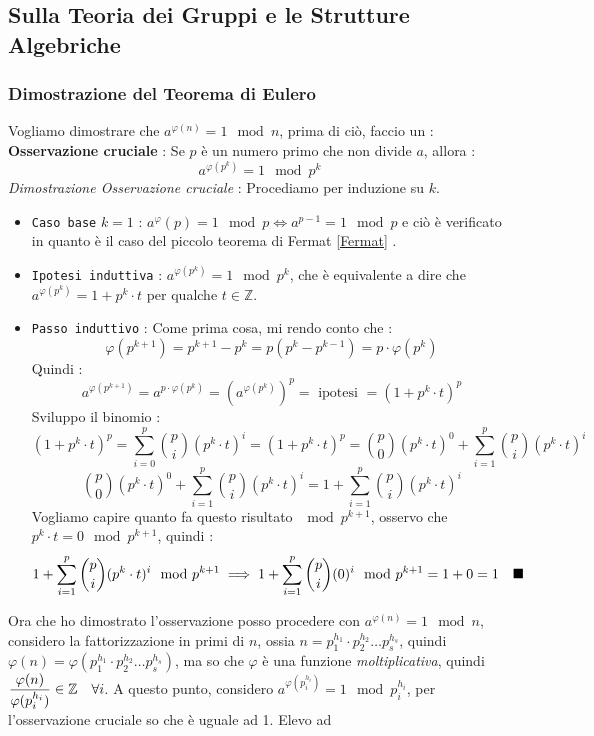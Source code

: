 \documentclass[12pt, letterpaper]{article}
\newcommand{\code}[1]{\colorbox{light-gray}{\texttt{#1}}}
\newcommand{\Z}{{\mathbb Z}}
\newcommand{\spaz}{{\text{\hphantom{aa}}}}
\begin{document}
\subsection{Sulla Teoria dei Gruppi e le Strutture Algebriche}
\subsubsection{Dimostrazione del Teorema di Eulero} \label{dimTeoEulero} 
Vogliamo dimostrare che \(a^{\varphi(n)}=1 \mod n\), prima di ciò, faccio un :\\
\textbf{Osservazione cruciale} : Se \(p\) è un numero primo che non divide \(a\), allora : 
$$a^{\varphi(p^k)}=1 \mod p^k$$
\textit{Dimostrazione Osservazione cruciale} : Procediamo per induzione su \(k\).\begin{itemize}
    \item  \code{Caso base} \(k=1\) : \(a^\varphi(p)=1 \mod p\iff a^{p-1}=1\mod p\) e ciò è verificato in quanto è il caso del piccolo 
    teorema di Fermat \ref{Fermat} .
    \item \code{Ipotesi induttiva} : \(a^{\varphi(p^k)}=1 \mod p^k\), che è equivalente a dire che  \(a^{\varphi(p^k)}=1+p^k\cdot t\) per qualche \(t\in\Z\).
    \item\code{Passo induttivo} : Come prima cosa, mi rendo conto che : 
    $$\varphi(p^{k+1})=p^{k+1}-p^k=p(p^k-p^{k-1})=p\cdot\varphi(p^k)$$
    Quindi : 
    $$a^{\varphi(p^{k+1})}=a^{p\cdot\varphi(p^k)}=(a^{\varphi(p^k)})^p=\text{ ipotesi }=(1+p^k\cdot t)^p$$
    Sviluppo il binomio : 
    $$(1+p^k\cdot t)^p=\sum_{i=0}^p\binom{p}{i}(p^k\cdot t)^i=(1+p^k\cdot t)^p=\binom{p}{0}(p^k\cdot t)^0+\sum_{i=1}^p\binom{p}{i}(p^k\cdot t)^i$$
    $$\binom{p}{0}(p^k\cdot t)^0+\sum_{i=1}^p\binom{p}{i}(p^k\cdot t)^i=1+\sum_{i=1}^p\binom{p}{i}(p^k\cdot t)^i$$
    Vogliamo capire quanto fa questo risultato \(\mod p^{k+1}\), osservo che \(p^k\cdot t =0 \mod p^{k+1}\), quindi : 
    $$1+\sum_{i=1}^p\binom{p}{i}(p^k\cdot t)^i\mod p^{k+1}\implies 1+\sum_{i=1}^p\binom{p}{i}(0)^i\mod p^{k+1}=1+0=1 \spaz \blacksquare$$
\end{itemize}
 Ora che ho dimostrato l'osservazione posso procedere con \(a^{\varphi(n)}=1 \mod n\), considero la fattorizzazione in primi 
 di \(n\), ossia \(n=p_1^{h_1}\cdot p_2^{h_2}\dots p_s^{h_s}\), quindi \(\varphi(n)=\varphi(p_1^{h_1}\cdot p_2^{h_2}\dots p_s^{h_s})\), 
 ma so che \(\varphi\) è una funzione \textit{moltiplicativa}, quindi \(\dfrac{\varphi(n)}{\varphi(p_i^{h_i})}\in \Z\spaz \forall i\).
A questo punto, considero \(a^{\varphi(p_i^{h_i})}=1\mod p_i^{h_i}\), per l'osservazione cruciale so che è uguale ad 1. Elevo ad 
\end{document}
